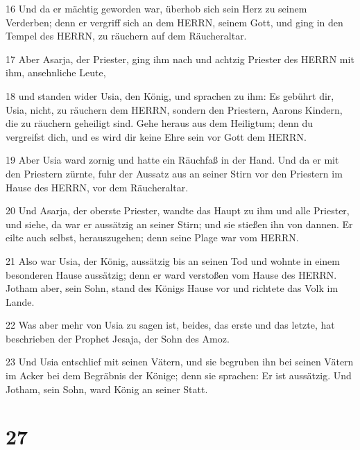 \par 16 Und da er mächtig geworden war, überhob sich sein Herz zu seinem Verderben; denn er vergriff sich an dem HERRN, seinem Gott, und ging in den Tempel des HERRN, zu räuchern auf dem Räucheraltar.
\par 17 Aber Asarja, der Priester, ging ihm nach und achtzig Priester des HERRN mit ihm, ansehnliche Leute,
\par 18 und standen wider Usia, den König, und sprachen zu ihm: Es gebührt dir, Usia, nicht, zu räuchern dem HERRN, sondern den Priestern, Aarons Kindern, die zu räuchern geheiligt sind. Gehe heraus aus dem Heiligtum; denn du vergreifst dich, und es wird dir keine Ehre sein vor Gott dem HERRN.
\par 19 Aber Usia ward zornig und hatte ein Räuchfaß in der Hand. Und da er mit den Priestern zürnte, fuhr der Aussatz aus an seiner Stirn vor den Priestern im Hause des HERRN, vor dem Räucheraltar.
\par 20 Und Asarja, der oberste Priester, wandte das Haupt zu ihm und alle Priester, und siehe, da war er aussätzig an seiner Stirn; und sie stießen ihn von dannen. Er eilte auch selbst, herauszugehen; denn seine Plage war vom HERRN.
\par 21 Also war Usia, der König, aussätzig bis an seinen Tod und wohnte in einem besonderen Hause aussätzig; denn er ward verstoßen vom Hause des HERRN. Jotham aber, sein Sohn, stand des Königs Hause vor und richtete das Volk im Lande.
\par 22 Was aber mehr von Usia zu sagen ist, beides, das erste und das letzte, hat beschrieben der Prophet Jesaja, der Sohn des Amoz.
\par 23 Und Usia entschlief mit seinen Vätern, und sie begruben ihn bei seinen Vätern im Acker bei dem Begräbnis der Könige; denn sie sprachen: Er ist aussätzig. Und Jotham, sein Sohn, ward König an seiner Statt.

\chapter{27}

